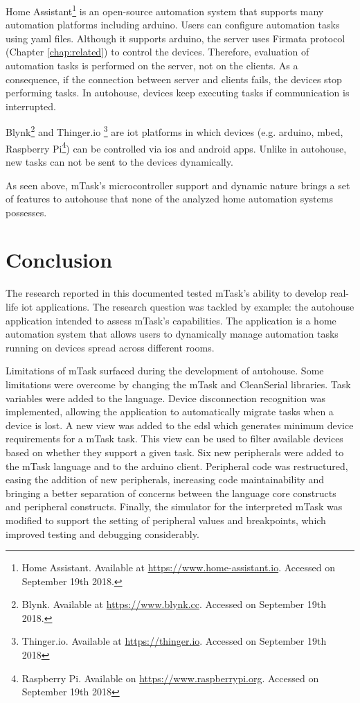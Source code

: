 Home Assistant\footnote{Home Assistant. Available at \url{https://www.home-assistant.io}. Accessed on September 19th 2018.} is an open-source automation system that supports many automation platforms including \gls{arduino}. Users can configure automation tasks using \gls{yaml} files. Although it supports \gls{arduino}, the server uses Firmata protocol (Chapter \ref{chap:related}) to control the devices. Therefore, evaluation of automation tasks is performed on the server, not on the clients. As a consequence, if the connection  between server and clients fails, the devices stop performing tasks. In \gls{autohouse}, devices keep executing tasks if communication is interrupted.

Blynk\footnote{Blynk. Available at \url{https://www.blynk.cc}. Accessed on September 19th 2018.} and Thinger.io \footnote{Thinger.io. Available at \url{https://thinger.io}. Accessed on September 19th 2018} are \ac{iot} platforms in which devices (e.g. \gls{arduino}, \gls{mbed}, Raspberry Pi\footnote{Raspberry Pi. Available on \url{https://www.raspberrypi.org}. Accessed on September 19th 2018}) can be controlled via \gls{ios} and \gls{android} apps. Unlike in \gls{autohouse}, new tasks can not be sent to the devices dynamically. 

As seen above, \gls{mTask}'s microcontroller support and dynamic nature brings a set of features to \gls{autohouse} that none of the analyzed home automation systems possesses.

\section{Conclusion}

The research reported in this documented tested \gls{mTask}'s ability to develop real-life \acs{iot} applications. The research question was tackled by example: the \gls{autohouse} application intended to assess \gls{mTask}'s capabilities. The application is a home automation system that allows users to dynamically manage automation tasks running on devices spread across different rooms. 

Limitations of \gls{mTask} surfaced during the development of \gls{autohouse}. Some limitations were overcome by changing the \gls{mTask} and CleanSerial libraries. Task variables were added to the language. Device disconnection recognition was implemented, allowing the application to automatically migrate tasks when a device is lost. A new view was added to the \ac{edsl} which generates minimum device requirements for a \gls{mTask} task. This view can be used to filter available devices based on whether they support a given task. Six new peripherals were added to the \gls{mTask} language and to the \gls{arduino} client. Peripheral code was restructured, easing the addition of new peripherals, increasing code maintainability and bringing a better separation of concerns between the language core constructs and peripheral constructs. Finally, the simulator for the interpreted \gls{mTask} was modified to support the setting of peripheral values and breakpoints, which improved testing and debugging considerably.


